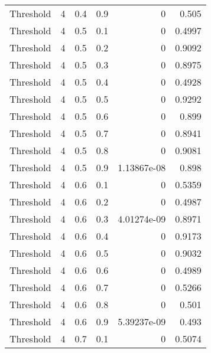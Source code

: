 \documentclass{article}
\begin{document}
\begin{longtable}[H]{lrrrrr}
 Threshold      &       4 &   0.4 &            0.9 &      0           &          0.505  \\
 Threshold      &       4 &   0.5 &            0.1 &      0           &          0.4997 \\
 Threshold      &       4 &   0.5 &            0.2 &      0           &          0.9092 \\
 Threshold      &       4 &   0.5 &            0.3 &      0           &          0.8975 \\
 Threshold      &       4 &   0.5 &            0.4 &      0           &          0.4928 \\
 Threshold      &       4 &   0.5 &            0.5 &      0           &          0.9292 \\
 Threshold      &       4 &   0.5 &            0.6 &      0           &          0.899  \\
 Threshold      &       4 &   0.5 &            0.7 &      0           &          0.8941 \\
 Threshold      &       4 &   0.5 &            0.8 &      0           &          0.9081 \\
 Threshold      &       4 &   0.5 &            0.9 &      1.13867e-08 &          0.898  \\
 Threshold      &       4 &   0.6 &            0.1 &      0           &          0.5359 \\
 Threshold      &       4 &   0.6 &            0.2 &      0           &          0.4987 \\
 Threshold      &       4 &   0.6 &            0.3 &      4.01274e-09 &          0.8971 \\
 Threshold      &       4 &   0.6 &            0.4 &      0           &          0.9173 \\
 Threshold      &       4 &   0.6 &            0.5 &      0           &          0.9032 \\
 Threshold      &       4 &   0.6 &            0.6 &      0           &          0.4989 \\
 Threshold      &       4 &   0.6 &            0.7 &      0           &          0.5266 \\
 Threshold      &       4 &   0.6 &            0.8 &      0           &          0.501  \\
 Threshold      &       4 &   0.6 &            0.9 &      5.39237e-09 &          0.493  \\
 Threshold      &       4 &   0.7 &            0.1 &      0           &          0.5074 \\

\end{longtable}
\end{document}
